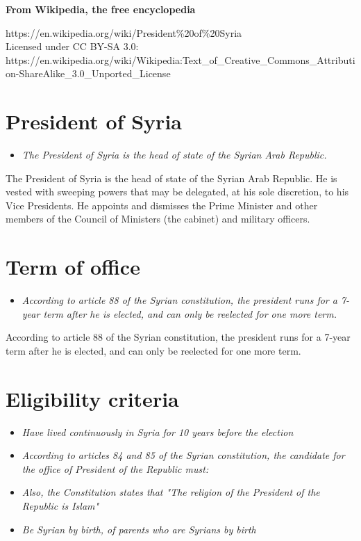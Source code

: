 \textbf{From Wikipedia, the free encyclopedia}

https://en.wikipedia.org/wiki/President\%20of\%20Syria\\
Licensed under CC BY-SA 3.0:\\
https://en.wikipedia.org/wiki/Wikipedia:Text\_of\_Creative\_Commons\_Attribution-ShareAlike\_3.0\_Unported\_License

\section{President of Syria}\label{president-of-syria}

\begin{itemize}
\item
  \emph{The President of Syria is the head of state of the Syrian Arab
  Republic.}
\end{itemize}

The President of Syria is the head of state of the Syrian Arab Republic.
He is vested with sweeping powers that may be delegated, at his sole
discretion, to his Vice Presidents. He appoints and dismisses the Prime
Minister and other members of the Council of Ministers (the cabinet) and
military officers.

\section{Term of office}\label{term-of-office}

\begin{itemize}
\item
  \emph{According to article 88 of the Syrian constitution, the
  president runs for a 7-year term after he is elected, and can only be
  reelected for one more term.}
\end{itemize}

According to article 88 of the Syrian constitution, the president runs
for a 7-year term after he is elected, and can only be reelected for one
more term.

\section{Eligibility criteria}\label{eligibility-criteria}

\begin{itemize}
\item
  \emph{Have lived continuously in Syria for 10 years before the
  election}
\item
  \emph{According to articles 84 and 85 of the Syrian constitution, the
  candidate for the office of President of the Republic must:}
\item
  \emph{Also, the Constitution states that "The religion of the
  President of the Republic is Islam"}
\item
  \emph{Be Syrian by birth, of parents who are Syrians by birth}
\end{itemize}

